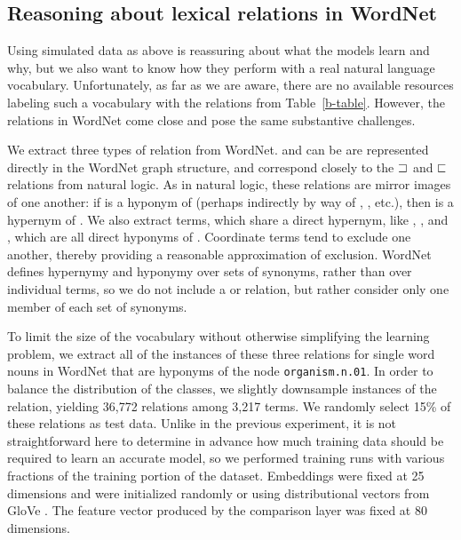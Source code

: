 \subsection*{Reasoning about lexical relations in WordNet}\label{sec:wordnet}

Using simulated data as above is reassuring about what the models
learn and why, but we also want to know how they perform with a real
natural language vocabulary. Unfortunately, as far as we are aware,
there are no available resources labeling such a vocabulary with the
relations from Table~\ref{b-table}. However, the relations in WordNet
\cite{fellbaum2010wordnet} come close and pose the same substantive
challenges.


We extract three types of relation from WordNet.  and
 can be are represented directly in the WordNet graph
structure, and correspond closely to the $\sqsupset$ and $\sqsubset$
relations from natural logic. As in natural logic, these relations are
mirror images of one another: if  is a hyponym of 
(perhaps indirectly by way of , , etc.), then
 is a hypernym of . We also extract 
terms, which share a direct hypernym, like , ,
and , which are all direct hyponyms of .  Coordinate
terms tend to exclude one another, thereby providing a reasonable
approximation of exclusion. WordNet defines hypernymy and hyponymy over
sets of synonyms, rather than over individual terms, so we do not
include a  or  relation, but rather
consider only one member of each set of synonyms.

To limit the size of the vocabulary without otherwise simplifying the learning problem, we extract all of the
instances of these three relations for single word nouns in WordNet that are hyponyms of the node 
\texttt{organism.n.01}. In order to balance the distribution of the classes, we slightly downsample instances 
of the  relation, yielding 36,772 relations among 3,217 terms. We randomly select 15\% of these 
relations as test data. Unlike in the previous experiment, it is not straightforward here to determine in advance
 how much training data should be required to learn an accurate model, so we performed training runs with 
 various fractions of the training portion of the 
dataset. Embeddings were fixed at 25 dimensions and were initialized randomly or using distributional 
vectors from GloVe \cite{pennington2014glove}. The feature vector produced by the comparison layer was fixed at 
80 dimensions.

